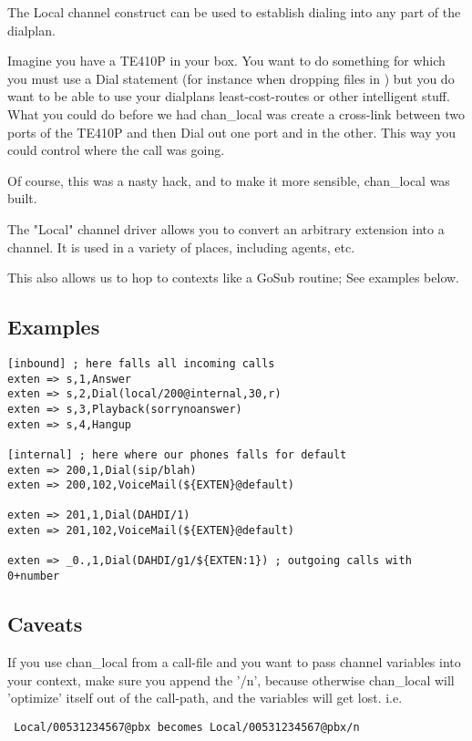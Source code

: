 The Local channel construct can be used to establish dialing into any part of
the dialplan.

Imagine you have a TE410P in your box. You want to do something for which you
must use a Dial statement (for instance when dropping files in
) but you do want to be able to use your dialplans
least-cost-routes or other intelligent stuff. What you could do before we had
chan\_local was create a cross-link between two ports of the TE410P and then
Dial out one port and in the other. This way you could control where the call
was going.

Of course, this was a nasty hack, and to make it more sensible, chan\_local was
built.

The "Local" channel driver allows you to convert an arbitrary extension into a
channel. It is used in a variety of places, including agents, etc.

This also allows us to hop to contexts like a GoSub routine; See examples below.

\subsection{Examples}
\begin{astlisting}
\begin{verbatim}
[inbound] ; here falls all incoming calls
exten => s,1,Answer
exten => s,2,Dial(local/200@internal,30,r)
exten => s,3,Playback(sorrynoanswer)
exten => s,4,Hangup

[internal] ; here where our phones falls for default
exten => 200,1,Dial(sip/blah)
exten => 200,102,VoiceMail(${EXTEN}@default)

exten => 201,1,Dial(DAHDI/1)
exten => 201,102,VoiceMail(${EXTEN}@default)

exten => _0.,1,Dial(DAHDI/g1/${EXTEN:1}) ; outgoing calls with 0+number
\end{verbatim}
\end{astlisting}

\subsection{Caveats}

If you use chan\_local from a call-file and you want to pass channel variables
into your context, make sure you append the '/n', because otherwise
chan\_local will 'optimize' itself out of the call-path, and the variables will
get lost. i.e.

\begin{verbatim}
 Local/00531234567@pbx becomes Local/00531234567@pbx/n
\end{verbatim}
